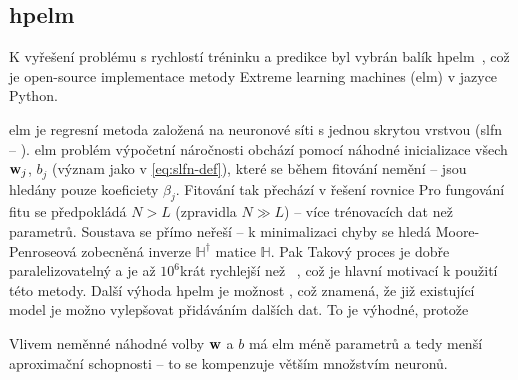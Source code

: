 \subsection{\acs{hpelm}}
K vyřešení problému s rychlostí tréninku a predikce byl vybrán balík \ac{hpelm}~\cite{hpelm}, což je open-source implementace metody Extreme learning 
machines (\ac{elm}) v jazyce Python.

\ac{elm} je regresní metoda založená na neuronové síti s jednou skrytou vrstvou (\ac{slfn} -- ). 
\ac{elm} problém výpočetní náročnosti obchází pomocí náhodné inicializace všech $\mathbf{w}_j$, $b_j$ (význam jako v \eqref{eq:slfn-def}), které se během fitování nemění -- jsou hledány 
pouze koeficiety $\beta_j$. Fitování tak přechází v řešení rovnice
Pro fungování fitu se předpokládá $N>L$ (zpravidla $N\gg L$) -- více trénovacích dat než parametrů. Soustava se přímo neřeší -- k minimalizaci 
chyby se hledá Moore-Penroseová zobecněná inverze $\mathbb{H}^{\dagger}$ matice $\mathbb{H}$. Pak 
Takový proces je dobře paralelizovatelný a je až $10^6$krát rychlejší než ~\cite{hpelm}, což je hlavní motivací 
k použití této metody. Další výhoda \ac{hpelm} je možnost , což znamená, že již existující model 
je možno vylepšovat přidáváním dalších dat. To je výhodné, protože 

Vlivem neměnné náhodné volby $\mathbf{w}$ a $b$ má \ac{elm} méně parametrů a tedy menší aproximační schopnosti -- to se kompenzuje 
větším množstvím neuronů. 

